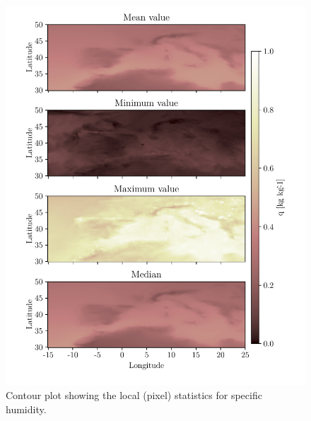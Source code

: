 \begin{figure}[ht]
    \centering
    \includegraphics{python_figs/all_stat_variable_q.pdf}
    \caption{Contour plot showing the local (pixel) statistics for specific humidity.}
    \label{fig:all_stats_q}
\end{figure}
\cleardoublepage
